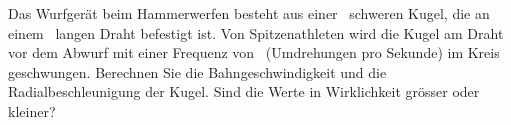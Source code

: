 Das Wurfgerät beim Hammerwerfen besteht aus einer \mhO\ schweren Kugel, die an einem \lhO\ langen Draht befestigt ist. Von Spitzenathleten wird die Kugel am Draht vor dem Abwurf mit einer Frequenz von \fhO\ (Umdrehungen pro Sekunde) im Kreis geschwungen. Berechnen Sie die Bahngeschwindigkeit und die Radialbeschleunigung der Kugel. Sind die Werte in Wirklichkeit grösser oder kleiner?
